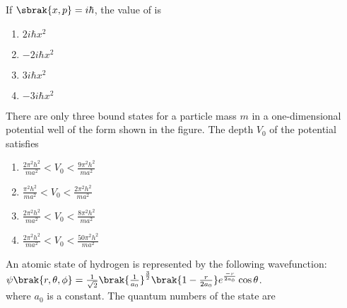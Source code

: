 \item If $\sbrak{x,p}=i\hbar$, the value of  is
\begin{multicols}{4}
    \begin{enumerate}
        \item $2i\hbar x^2$
        \item $-2i\hbar x^2$
        \item $3i\hbar x^2$
        \item $-3i\hbar x^2$
    \end{enumerate}
\end{multicols}
\item There are only three bound states for a particle mass $m$ in a one-dimensional potential well of the form shown in the figure. The depth $V_0$ of the potential satisfies
\begin{minipage}[t]{0.5\textwidth}
\raggedleft
{}
\end{minipage}
\begin{multicols}{2}
    \begin{enumerate}
        \item $\frac{2\pi^2 h^2}{ma^2}<V_0<\frac{9\pi^2 h^2}{ma^2}$
        \item $\frac{\pi^2 h^2}{ma^2}<V_0<\frac{2\pi^2 h^2}{ma^2}$
        \item $\frac{2\pi^2 h^2}{ma^2}<V_0<\frac{8\pi^2 h^2}{ma^2}$
        \item $\frac{2\pi^2 h^2}{ma^2}<V_0<\frac{50\pi^2 h^2}{ma^2}$
    \end{enumerate}
\end{multicols}
\item An atomic state of hydrogen is represented by the following wavefunction:\\
	$\psi\brak{r,\theta,\phi}=\frac{1}{\sqrt{2}}\brak{\frac{1}{a_0}}^{\frac{3}{2}}\brak{1-\frac{r}{2a_0}}e^{\frac{-r}{2a_0}}\cos\theta$.\\ where $a_0$ is a constant. The quantum numbers of the state are

